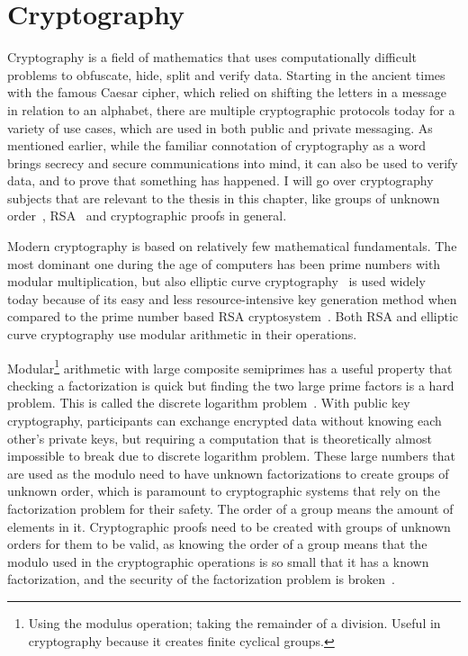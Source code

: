 \section{Cryptography}

Cryptography is a field of mathematics that uses computationally difficult problems to obfuscate, hide, split and verify data. Starting in the ancient times with the famous Caesar cipher, which relied on shifting the letters in a message in relation to an alphabet, there are multiple cryptographic protocols today for a variety of use cases, which are used in both public and private messaging. As mentioned earlier, while the familiar connotation of cryptography as a word brings secrecy and secure communications into mind, it can also be used to verify data, and to prove that something has happened. I will go over cryptography subjects that are relevant to the thesis in this chapter, like groups of unknown order~\cite{Brent2000-zp}, RSA~\cite{Rivest1978-fm} and cryptographic proofs in general.

Modern cryptography is based on relatively few mathematical fundamentals. The most dominant one during the age of computers has been prime numbers with modular multiplication, but also elliptic curve cryptography~\cite{Koblitz1987-vf, Miller1986-be} is used widely today because of its easy and less resource-intensive key generation method when compared to the prime number based RSA cryptosystem~\cite{noauthor_undated-hj}. Both RSA and elliptic curve cryptography use modular arithmetic in their operations.

Modular\footnote{Using the modulus operation; taking the remainder of a division. Useful in cryptography because it creates finite cyclical groups.} arithmetic with large composite semiprimes has a useful property that checking a factorization is quick but finding the two large prime factors is a hard problem. This is called the discrete logarithm problem~\cite{Joux2014-rz}. With public key cryptography, participants can exchange encrypted data without knowing each other's private keys, but requiring a computation that is theoretically almost impossible to break due to discrete logarithm problem. These large numbers that are used as the modulo need to have unknown factorizations to create groups of unknown order, which is paramount to cryptographic systems that rely on the factorization problem for their safety. The order of a group means the amount of elements in it. Cryptographic proofs need to be created with groups of unknown orders for them to be valid, as knowing the order of a group means that the modulo used in the cryptographic operations is so small that it has a known factorization, and the security of the factorization problem is broken~\cite{Dobson_undated-aw}.

